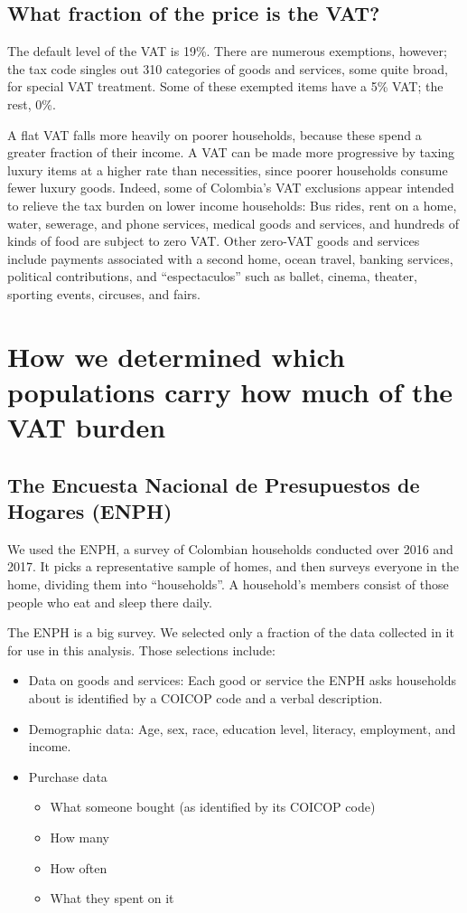 \documentclass[preprint,12pt]{elsarticle}
\begin{document}
\subsection{What fraction of the price is the VAT?}

The default level of the VAT is 19\%. There are numerous exemptions, however; the tax code singles out 310 categories of goods and services, some quite broad, for special VAT treatment. Some of these exempted items have a 5\% VAT; the rest, 0\%.

A flat VAT falls more heavily on poorer households, because these spend a greater fraction of their income. A VAT can be made more progressive by taxing luxury items at a higher rate than necessities, since poorer households consume fewer luxury goods. Indeed, some of Colombia's VAT exclusions appear intended to relieve the tax burden on lower income households: Bus rides, rent on a home, water, sewerage, and phone services, medical goods and services, and hundreds of kinds of food are subject to zero VAT. Other zero-VAT goods and services include payments associated with a second home, ocean travel, banking services, political contributions, and ``espectaculos'' such as ballet, cinema, theater, sporting events, circuses, and fairs.


\section{How we determined which populations carry how much of the VAT burden}

\subsection{The Encuesta Nacional de Presupuestos de Hogares (ENPH)}

We used the ENPH, a survey of Colombian households conducted over 2016 and 2017. It picks a representative sample of homes, and then surveys everyone in the home, dividing them into ``households''. A household's members consist of those people who eat and sleep there daily.

The ENPH is a big survey. We selected only a fraction of the data collected in it for use in this analysis. Those selections include:

\begin{itemize}
  \item Data on goods and services: Each good or service the ENPH asks households about is identified by a COICOP code and a verbal description.
  \item  Demographic data: Age, sex, race, education level, literacy, employment, and income.
  \item  Purchase data
  \begin{itemize}
      \item  What someone bought (as identified by its COICOP code)
      \item  How many
      \item  How often
      \item  What they spent on it
  \end{itemize}
\end{itemize}
\end{document}
